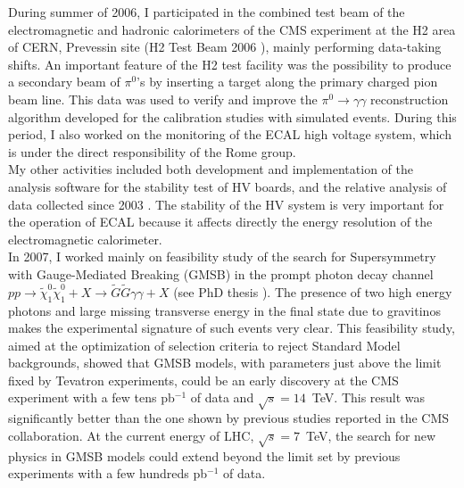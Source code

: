 \documentclass[10pt, a4paper]{article}
\begin{document}
During summer of 2006, I participated in the combined test beam of the electromagnetic and 
hadronic calorimeters of the CMS experiment at the H2 area of CERN, Prevessin site 
(H2 Test Beam 2006 \cite{Abdullin:2009zz}), mainly performing data-taking shifts.
An important feature of the H2 test facility was the possibility to produce a secondary beam
of $\pi^0$'s by inserting a target along the primary charged pion beam line. 
This data \cite{Adzic:2008zza} was used to verify and improve the $\pi^0 \rightarrow \gamma\gamma$ 
reconstruction algorithm developed for the calibration studies with simulated events.
During this period, I also worked on the monitoring of the ECAL high voltage system, which is 
under the direct responsibility of the Rome group. \\

My other activities included both development and implementation of the analysis software for the 
stability test of HV boards, and the relative analysis of data collected since 2003 \cite{Bartoloni:2007hx}. 
The stability of the HV system is very important for the operation of ECAL because it affects directly 
the energy resolution of the electromagnetic calorimeter. \\

In 2007, I worked mainly on feasibility study of the search for Supersymmetry 
with Gauge-Mediated Breaking (GMSB) in the prompt photon decay channel 
$pp \rightarrow \tilde{\chi}_1^0 \tilde{\chi}_1^0 + X \rightarrow \tilde{G} \tilde{G} \gamma \gamma + X$ 
(see PhD thesis \cite{Santanastasio:DOTTORATO}). 
The presence of two high energy photons and large missing transverse energy
in the final state due to gravitinos makes the experimental signature of such events very clear.
This feasibility study, aimed at the optimization of selection criteria to reject Standard Model backgrounds, 
showed that GMSB models, with parameters just above the limit fixed by Tevatron experiments, 
could be an early discovery at the CMS experiment with a few tens pb$^{-1}$ of data and $\sqrt{s}=14$~TeV. 
This result was significantly better than the one shown by previous studies reported in the CMS collaboration.
At the current energy of LHC, $\sqrt{s}=7$~TeV, the search for new physics in GMSB models 
could extend beyond the limit set by previous experiments with a few hundreds pb$^{-1}$ of data. 
\end{document}
